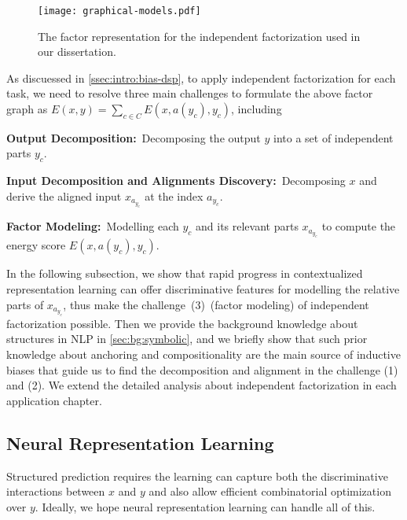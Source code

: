 \begin{figure}[!tbp]
\centering
\texttt{[image: graphical-models.pdf]}
\caption{\label{fig:bg:graphical-model}The factor representation for
  the independent factorization used in our dissertation.}
\end{figure}

As discuessed in \autoref{ssec:intro:bias-dsp}, to apply independent
factorization for each task, we need to resolve three main challenges
to formulate the above factor graph as
$E(x, y) = \sum_{c \in C}E(x, a(y_{c}), y_{c})$, including
\begin{inparaenum}[(1)]
\item \textbf{Output Decomposition:}~Decomposing the output $y$ into a set of independent parts
  $y_{c}$.
\item \textbf{Input Decomposition and Alignments Discovery:}~Decomposing $x$ and derive the aligned input $x_{a_{y_{c}}}$ at
  the index $a_{y_{c}}$.
\item \textbf{Factor Modeling:}~Modelling each $y_{c}$ and its
  relevant parts $x_{a_{y_{c}}}$ to compute the energy score
  $E(x, a(y_{c}), y_{c})$.
\end{inparaenum}

In the following subsection, we show that rapid progress in
contextualized representation learning can offer discriminative
features for modelling the relative parts of $x_{a_{y_{c}}}$, thus
make the challenge~(3)~(factor modeling) of independent factorization possible. Then we
provide the background knowledge about structures in NLP in
\autoref{sec:bg:symbolic}, and we briefly show that such prior
knowledge about anchoring and compositionality are the main source of
inductive biases that guide us to find the decomposition and alignment
in the challenge (1) and (2). We extend the detailed analysis about
independent factorization in each application chapter.

\subsection{Neural Representation Learning}
\label{ssec:bg:rep-learning}

Structured prediction requires the learning can capture both the
discriminative interactions between $x$ and $y$ and also allow
efficient combinatorial optimization over $y$. Ideally, we hope neural
representation learning can handle all of this.

